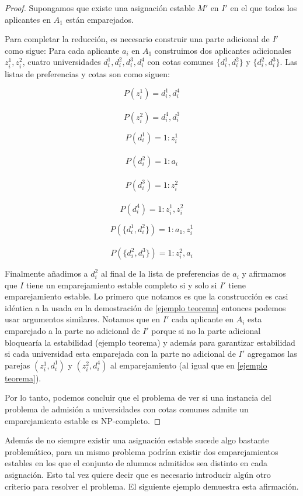 \begin{proof}
Supongamos que existe una asignación estable $M'$ en $I'$ en el que todos los aplicantes en $A_1$ están emparejados.


Para completar la reducción, es necesario construir una parte adicional de $I'$ como sigue: Para cada aplicante $a_i$ en $A_1$ construimos dos aplicantes adicionales $z_i^1,z_i^2$, cuatro universidades $d_i^1,d_i^2,d_i^3,d_i^4$ con cotas comunes $\{d_i^1,d_i^2\}$ y $\{d_i^2,d_i^3\}$. Las listas de preferencias y cotas son como siguen:
\noindent \begin{minipage}{.3\linewidth}
$$P(z_i^1)=d_i^1,d_i^4$$ \\
$$P(z_i^2)=d_i^4,d_i^3$$ 
\end{minipage}%
\begin{minipage}{.3\linewidth}
$$P(d_i^1)=1:z_i^1$$ \\
$$P(d_i^2)=1:a_i$$ \\
$$P(d_i^3)=1: z_i^2$$ \\
$$P(d_i^4)=1: z_i^1,z_i^2$$ 
\end{minipage}
\begin{minipage}{.4\linewidth}
$$P(\{d_i^1,d_i^2\})= 1:a_1,z_i^1$$ \\
$$P(\{d_i^2,d_i^3\})=1:z_i^2,a_i$$
\end{minipage}

Finalmente añadimos a $d_i^2$ al final de la lista de preferencias de $a_i$ y afirmamos que $I$ tiene un emparejamiento estable completo si y solo si $I'$ tiene emparejamiento estable. Lo primero que notamos es que la construcción es casi idéntica a la usada en la demostración de \ref{ejemplo teorema} entonces podemos usar argumentos similares. Notamos que en $I'$ cada aplicante en $A_i$ esta emparejado a la parte no adicional de $I'$ porque si no la parte adicional bloquearía la estabilidad ({ejemplo teorema}) y además para garantizar estabilidad si cada universidad esta emparejada con la parte no adicional de $I'$ agregamos las parejas $(z_i^1,d_i^1)$ y $(z_i^2,d_i^4)$ al emparejamiento (al igual que en \ref{ejemplo teorema}).

Por lo tanto, podemos concluir que el problema de ver si una instancia del problema de admisión a universidades con cotas comunes admite un emparejamiento estable es NP-completo.

\end{proof}

Además de no siempre existir una asignación estable sucede algo bastante problemático, para un mismo problema podrían existir dos emparejamientos estables en los que el conjunto de alumnos admitidos sea distinto en cada asignación. Esto tal vez quiere decir que es necesario introducir algún otro criterio para resolver el problema. El siguiente ejemplo demuestra esta afirmación. 

